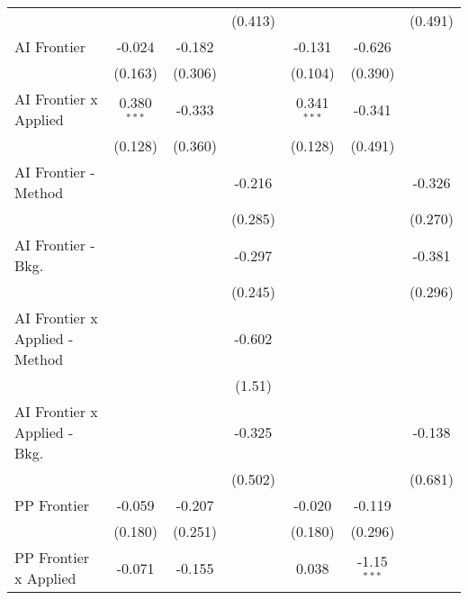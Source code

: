 \begin{tabular}{lcccccc}
                                  &                &              & (0.413)       &               &               & (0.491)\\   
   AI Frontier                    & -0.024         & -0.182       &               & -0.131        & -0.626        &   \\   
                                  & (0.163)        & (0.306)      &               & (0.104)       & (0.390)       &   \\   
   AI Frontier x Applied          & 0.380$^{***}$  & -0.333       &               & 0.341$^{***}$ & -0.341        &   \\   
                                  & (0.128)        & (0.360)      &               & (0.128)       & (0.491)       &   \\   
   AI Frontier - Method           &                &              & -0.216        &               &               & -0.326\\   
                                  &                &              & (0.285)       &               &               & (0.270)\\   
   AI Frontier - Bkg.             &                &              & -0.297        &               &               & -0.381\\   
                                  &                &              & (0.245)       &               &               & (0.296)\\   
   AI Frontier x Applied - Method &                &              & -0.602        &               &               &   \\   
                                  &                &              & (1.51)        &               &               &   \\   
   AI Frontier x Applied - Bkg.   &                &              & -0.325        &               &               & -0.138\\   
                                  &                &              & (0.502)       &               &               & (0.681)\\   
   PP Frontier                    & -0.059         & -0.207       &               & -0.020        & -0.119        &   \\   
                                  & (0.180)        & (0.251)      &               & (0.180)       & (0.296)       &   \\   
   PP Frontier x Applied          & -0.071         & -0.155       &               & 0.038         & -1.15$^{***}$ &   \\   

\end{tabular}
